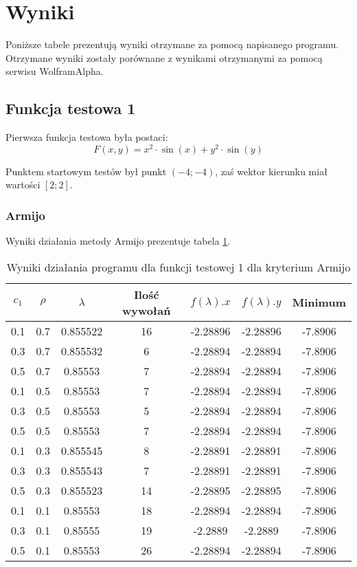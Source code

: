 \documentclass{classrep}
\begin{document}
\section{Wyniki}
Poniższe tabele prezentują wyniki otrzymane za pomocą napisanego programu. Otrzymane wyniki zostały porównane z wynikami otrzymanymi za pomocą serwisu WolframAlpha.

\subsection{Funkcja testowa 1}
Pierwsza funkcja testowa była postaci:
\begin{equation}
 F(x, y) = x^2 \cdot \sin(x) + y^2 \cdot \sin(y)
\end{equation}

Punktem startowym testów był punkt $(-4; -4)$, zaś wektor kierunku miał wartości $[2; 2]$.

\subsubsection{Armijo}

Wyniki działania metody Armijo prezentuje tabela \ref{armijo1}.

\begin{table}
  \centering
  \caption{Wyniki działania programu dla funkcji testowej 1 dla kryterium Armijo}
  \label{armijo1}
  \begin{tabular}{|c|c|c|c|c|c|c|}
    \hline
    $c_1$ & $\rho$ & $\lambda$ & Ilość wywołań & $f(\lambda).x$ & $f(\lambda).y$ & Minimum \\
    \hline
    0.1 & 0.7 & 0.855522 & 16 & -2.28896 & -2.28896 & -7.8906 \\
    0.3 & 0.7 & 0.855532 & 6 & -2.28894 & -2.28894 & -7.8906 \\
    0.5 & 0.7 & 0.85553 & 7 & -2.28894 & -2.28894 & -7.8906 \\
    0.1 & 0.5 & 0.85553 & 7 & -2.28894 & -2.28894 & -7.8906 \\
    0.3 & 0.5 & 0.85553 & 5 & -2.28894 & -2.28894 & -7.8906 \\
    0.5 & 0.5 & 0.85553 & 7 & -2.28894 & -2.28894 & -7.8906 \\
    0.1 & 0.3 & 0.855545 & 8 & -2.28891 & -2.28891 & -7.8906 \\
    0.3 & 0.3 & 0.855543 & 7 & -2.28891 & -2.28891 & -7.8906 \\
    0.5 & 0.3 & 0.855523 & 14 & -2.28895 & -2.28895 & -7.8906 \\
    0.1 & 0.1 & 0.85553 & 18 & -2.28894 & -2.28894 & -7.8906 \\
    0.3 & 0.1 & 0.85555 & 19 & -2.2889 & -2.2889 & -7.8906 \\
    0.5 & 0.1 & 0.85553 & 26 & -2.28894 & -2.28894 & -7.8906 \\
    \hline
  \end{tabular}
\end{table}
\end{document}
